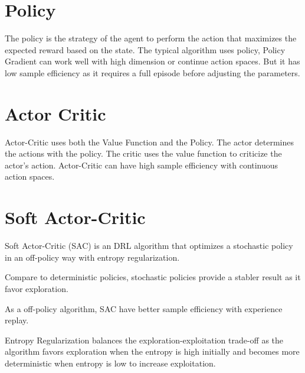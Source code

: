 \section{Policy}
The policy is the strategy of the agent to perform the action that maximizes the expected reward based on the state.  The typical algorithm uses policy, Policy Gradient can work well with high dimension or continue action spaces. But it has low sample efficiency as it requires a full episode before adjusting the parameters.

\section{Actor Critic}
Actor-Critic uses both the Value Function and the Policy. The actor determines the actions with the policy. The critic uses the value function to criticize the actor's action. Actor-Critic can have high sample efficiency with continuous action spaces.

\section{Soft Actor-Critic}
Soft Actor-Critic (SAC) is an DRL algorithm that optimizes a stochastic policy in an off-policy way with entropy regularization.
\par
Compare to deterministic policies, stochastic policies provide a stabler result as it favor exploration.
\par 
As a off-policy algorithm, SAC have better sample efficiency with experience replay.
\par
Entropy Regularization balances the exploration-exploitation trade-off as the algorithm favors exploration when the entropy is high initially and becomes more deterministic when entropy is low to increase exploitation.